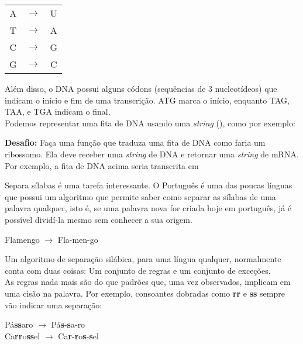 \documentclass[12pt]{article}
\begin{document}
	\begin{center}
			\begin{tabular}{ccc}
				A & $\rightarrow$ & U\\
				T & $\rightarrow$ & A\\
				C & $\rightarrow$ & G\\
				G & $\rightarrow$ & C\\
			\end{tabular}
	\end{center}
	
	Além disso, o DNA possui alguns códons (sequências de 3 nucleotídeos) que indicam o início e fim de uma transcrição. ATG marca o início, enquanto TAG, TAA, e TGA indicam o final.\\
	
	Podemos representar uma fita de DNA usando uma \emph{string} (), como por exemplo:
	\begin{center}
	\end{center}
	
	\textbf{Desafio:} Faça uma função que traduza uma fita de DNA como faria um ribossomo. Ela deve receber uma \textit{string} de DNA e retornar uma \textit{string} de mRNA. Por exemplo, a fita de DNA acima seria transcrita em
	\begin{center}
	\end{center}
	
	
	
	Separa sílabas é uma tarefa interessante. O Português é uma das poucas línguas que possui um algoritmo que permite saber como separar as sílabas de uma palavra qualquer, isto é, se uma palavra nova for criada hoje em português, já é possível dividí-la mesmo sem conhecer a sua origem.
	
	\begin{center}
		Flamengo $\to$ Fla-men-go
	\end{center}
	
	Um algoritmo de separação silábica, para uma língua qualquer, normalmente conta com duas coisas: Um conjunto de regras e um conjunto de exceções.\\
	
	As regras nada mais são do que padrões que, uma vez observados, implicam em uma cisão na palavra. Por exemplo, consoantes dobradas como \textbf{rr} e \textbf{ss} sempre vão indicar uma separação:
	
	\begin{center}
		Pá\textbf{ss}aro $\to$ Pá\textbf{s}-\textbf{s}a-ro\\
		Ca\textbf{rr}o\textbf{ss}el $\to$ Ca\textbf{r}-\textbf{r}o\textbf{s}-\textbf{s}el
	\end{center}
	
\end{document}
